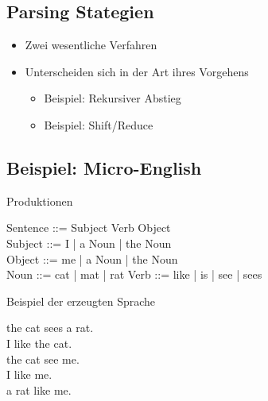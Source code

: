 \subsection{Parsing Stategien}
\begin{itemize}
    \item Zwei wesentliche Verfahren
    \item Unterscheiden sich in der Art ihres Vorgehens
    \begin{itemize}
        \item {}  Beispiel: Rekursiver Abstieg
        \item {} Beispiel: Shift/Reduce
    \end{itemize}
\end{itemize}

\subsection{Beispiel: Micro-English}
Produktionen
\begin{center}
    Sentence ::= Subject Verb Object\\
    Subject ::= I | a Noun | the Noun\\
    Object ::= me | a Noun | the Noun\\
    Noun ::= cat | mat | rat
    Verb ::= like | is | see | sees
\end{center}
Beispiel der erzeugten Sprache
\begin{center}
    the cat sees a rat.\\
    I like the cat.\\
    the cat see me.\\
    I like me.\\
    a rat like me.
\end{center}

